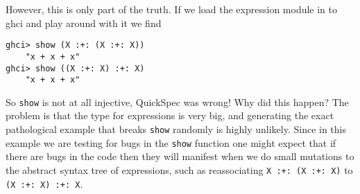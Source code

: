 However, this is only part of the truth. If we load the expression module in to ghci and
play around with it we find
\begin{verbatim}
ghci> show (X :+: (X :+: X))
    "x + x + x"
ghci> show ((X :+: X) :+: X)
    "x + x + x"
\end{verbatim}
So \texttt{show} is not at all injective, QuickSpec was wrong! Why did this happen?
The problem is that the type for expressions is very big, and generating the exact pathological
example that breaks \texttt{show} randomly is highly unlikely. Since in this example we are testing
for bugs in the \texttt{show} function one might expect that if there are bugs in the code then
they will manifest when we do small mutations to the abstract syntax tree of expressions, such as
reassociating \texttt{X :+: (X :+: X)} to \texttt{(X :+: X) :+: X}.
